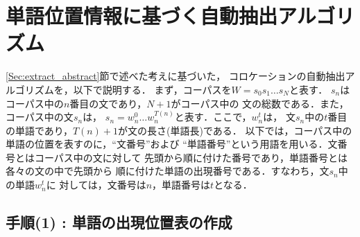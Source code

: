 \section{単語位置情報に基づく自動抽出アルゴリズム}
\label{Sec:extract_algorithm}

\ref{Sec:extract_abstract}節で述べた考えに基づいた，
コロケーションの自動抽出アルゴリズムを，以下で説明する．
まず，コーパスを\(W=s_0 s_1 \ldots s_N\)と表す．
$s_n$はコーパス中の$n$番目の文であり，$N+1$がコーパス中の
文の総数である．また，コーパス中の文$s_n$は，
\(s_n = w_n^0 \ldots w_n^{T(n)}\)と表す．ここで，$w_n^t$は，
文$s_n$中の$t$番目の単語であり，\hspace{-0.2mm}$T(n)+1$\hspace{-0.2mm}が文の長さ(単語長)である．
以下では，コーパス中の単語の位置を表すのに，``文番号''および
``単語番号''という用語を用いる．文番号とはコーパス中の文に対して
先頭から順に付けた番号であり，単語番号とは各々の文の中で先頭から
順に付けた単語の出現番号である．すなわち，文\hspace{-0.2mm}$s_n$\hspace{-0.2mm}中の単語$w_n^t$に
対しては，文番号は$n$，単語番号は$t$となる．

\subsection*{手順(1) : 単語の出現位置表の作成}

